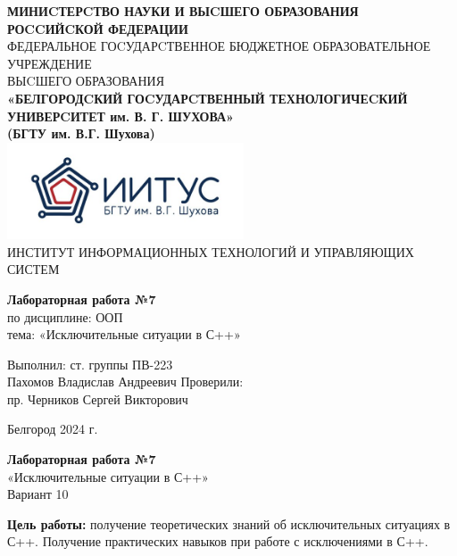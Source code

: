 \documentclass[a4paper,14pt]{extarticle}
\newcommand\textbox[1]{
	\parbox{.45\textwidth}{#1}
}
\begin{document}
\begin{center}
    \small{
        \textbf{МИНИCТЕРCТВО НАУКИ И ВЫCШЕГО ОБРАЗОВАНИЯ РОCCИЙCКОЙ ФЕДЕРАЦИИ}\\
        ФЕДЕРАЛЬНОЕ ГОCУДАРCТВЕННОЕ БЮДЖЕТНОЕ ОБРАЗОВАТЕЛЬНОЕ УЧРЕЖДЕНИЕ\\ВЫCШЕГО ОБРАЗОВАНИЯ \\
        \textbf{«БЕЛГОРОДCКИЙ ГОCУДАРCТВЕННЫЙ ТЕХНОЛОГИЧЕCКИЙ\\УНИВЕРCИТЕТ им. В. Г. ШУХОВА»\\ (БГТУ им. В.Г. Шухова)} \\
        \bigbreak
        \includegraphics[width=70mm]{log}\\
        ИНСТИТУТ ИНФОРМАЦИОННЫХ ТЕХНОЛОГИЙ И УПРАВЛЯЮЩИХ СИСТЕМ\\}
\end{center}

\vfill
\begin{center}
    \large{
        \textbf{
            Лабораторная работа №7}}\\
    \normalsize{
        по дисциплине: ООП \\
        тема: «Исключительные ситуации в С++»}
\end{center}
\vfill
\hfill\textbox{
    Выполнил: ст. группы ПВ-223\\Пахомов Владислав Андреевич
    \bigbreak
    Проверили: \\пр. Черников Сергей Викторович
}
\vfill\begin{center}
    Белгород 2024 г.
\end{center}
\newpage
\begin{center}
    \textbf{Лабораторная работа №7}\\
    «Исключительные ситуации в С++»\\
    Вариант 10
\end{center}
\textbf{Цель работы: }получение теоретических знаний об исключительных ситуациях
в С++. Получение практических навыков при работе с исключениями в С++.
\end{document}
